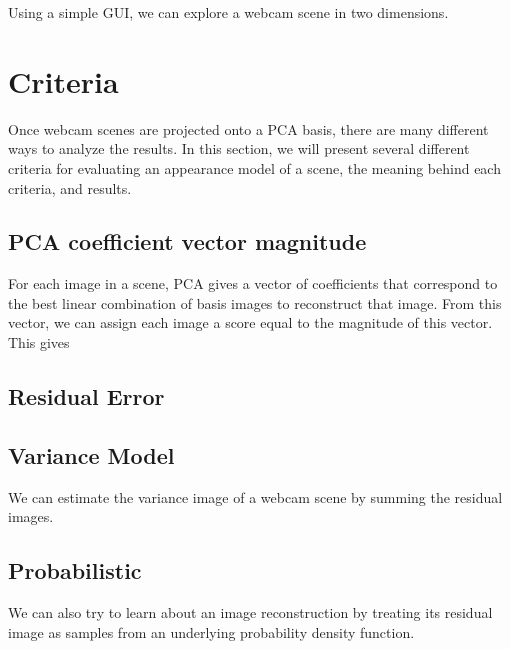 Using a simple GUI, we can explore a webcam scene in two dimensions.


\section{Criteria}

Once webcam scenes are projected onto a PCA basis, there are many different ways to analyze the results.
In this section, we will present several different criteria for evaluating an appearance model of a scene,
the meaning behind each criteria, and results.

\subsection{PCA coefficient vector magnitude}

For each image in a scene, PCA gives a vector of coefficients that correspond to the best linear combination
of basis images to reconstruct that image.  From this vector, we can assign each image a score equal to the
magnitude of this vector.  This gives

\subsection{Residual Error}




\subsection{Variance Model}

We can estimate the variance image of a webcam scene by summing the residual images.


\subsection{Probabilistic}

We can also try to learn about an image reconstruction by treating its residual image as samples from an 
underlying probability density function.


